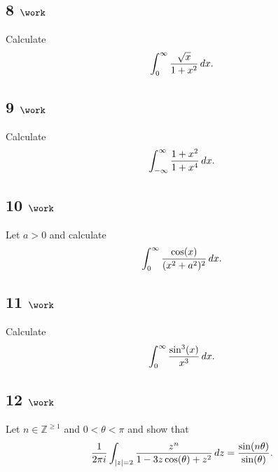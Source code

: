 \hypertarget{work-55}{%
\subsection{\texorpdfstring{8
\(\work\)}{8 \textbackslash work}}\label{work-55}}

Calculate
\begin{align*}
\int_0^\infty {\sqrt x \over 1 + x^2} \, dx
.\end{align*}

\hypertarget{work-56}{%
\subsection{\texorpdfstring{9
\(\work\)}{9 \textbackslash work}}\label{work-56}}

Calculate
\begin{align*}
\int_{-\infty}^\infty {1+x^2 \over 1+x^4}\, dx
.\end{align*}

\hypertarget{work-57}{%
\subsection{\texorpdfstring{10
\(\work\)}{10 \textbackslash work}}\label{work-57}}

Let \(a>0\) and calculate
\begin{align*}
\int_0^\infty {\cos(x) \over (x^2 + a^2)^2}\, dx
.\end{align*}

\hypertarget{work-58}{%
\subsection{\texorpdfstring{11
\(\work\)}{11 \textbackslash work}}\label{work-58}}

Calculate
\begin{align*}
\int_0^\infty {\sin^3(x) \over x^3} \, dx
.\end{align*}

\hypertarget{work-59}{%
\subsection{\texorpdfstring{12
\(\work\)}{12 \textbackslash work}}\label{work-59}}

Let \(n\in {\mathbb{Z}}^{\geq 1}\) and \(0<\theta<\pi\) and show that
\begin{align*}
{1\over 2\pi i} \int_{{\left\lvert {z} \right\rvert} = 2} {z^n \over 1 -3z\cos(\theta) + z^2} \,dz = {\sin(n\theta) \over \sin(\theta)}
.\end{align*}

